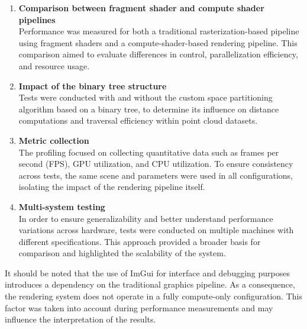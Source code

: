 \documentclass{rapportcs}
\begin{document}
        \begin{enumerate}
        
            \item \textbf{Comparison between fragment shader and compute shader pipelines}\\
                Performance was measured for both a traditional rasterization-based pipeline using fragment shaders and a compute-shader-based rendering pipeline. This comparison aimed to evaluate differences in control, parallelization efficiency, and resource usage.\\
            
            \item \textbf{Impact of the binary tree structure}\\
                Tests were conducted with and without the custom space partitioning algorithm based on a binary tree, to determine its influence on distance computations and traversal efficiency within point cloud datasets.\\
            
            \item \textbf{Metric collection}\\
                The profiling focused on collecting quantitative data such as frames per second (FPS), GPU utilization, and CPU utilization. To ensure consistency across tests, the same scene and parameters were used in all configurations, isolating the impact of the rendering pipeline itself.\\

            \item \textbf{Multi-system testing}\\
                In order to ensure generalizability and better understand performance variations across hardware, tests were conducted on multiple machines with different specifications. This approach provided a broader basis for comparison and highlighted the scalability of the system.\\

        \end{enumerate}
        
        It should be noted that the use of ImGui for interface and debugging purposes introduces a dependency on the traditional graphics pipeline. As a consequence, the rendering system does not operate in a fully compute-only configuration. This factor was taken into account during performance measurements and may influence the interpretation of the results.
\end{document}
